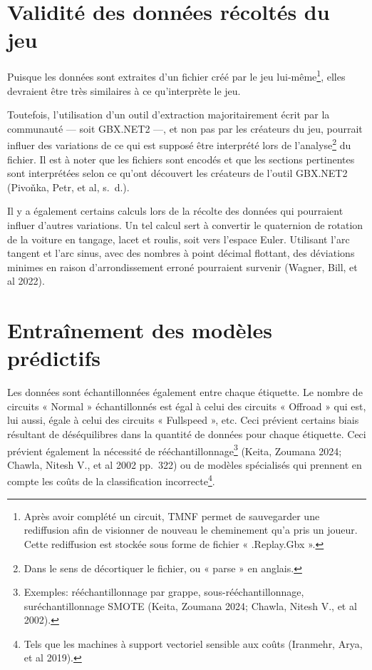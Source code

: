 \documentclass[
  oneside,
  open=any]{scrreprt}
\begin{document}
\section{Validité des données récoltés du
jeu}\label{validituxe9-des-donnuxe9es-ruxe9coltuxe9s-du-jeu}

Puisque les données sont extraites d'un fichier créé par le jeu
lui-même\footnote{Après avoir complété un circuit, TMNF permet de
  sauvegarder une rediffusion afin de visionner de nouveau le
  cheminement qu'a pris un joueur. Cette rediffusion est stockée sous
  forme de fichier « .Replay.Gbx ».}, elles devraient être très
similaires à ce qu'interprète le jeu.

Toutefois, l'utilisation d'un outil d'extraction majoritairement écrit
par la communauté --- soit GBX.NET2 ---, et non pas par les créateurs du
jeu, pourrait influer des variations de ce qui est supposé être
interprété lors de l'analyse\footnote{Dans le sens de décortiquer le
  fichier, ou « parse » en anglais.} du fichier. Il est à noter que les
fichiers sont encodés et que les sections pertinentes sont interprétées
selon ce qu'ont découvert les créateurs de l'outil GBX.NET2 (Pivoňka,
Petr, et al, s.~d.).

Il y a également certains calculs lors de la récolte des données qui
pourraient influer d'autres variations. Un tel calcul sert à convertir
le quaternion de rotation de la voiture en tangage, lacet et roulis,
soit vers l'espace Euler. Utilisant l'arc tangent et l'arc sinus, avec
des nombres à point décimal flottant, des déviations minimes en raison
d'arrondissement erroné pourraient survenir (Wagner, Bill, et al 2022).

\section{Entraînement des modèles
prédictifs}\label{entrauxeenement-des-moduxe8les-pruxe9dictifs}

Les données sont échantillonnées également entre chaque étiquette. Le
nombre de circuits « Normal » échantillonnés est égal à celui des
circuits « Offroad » qui est, lui aussi, égale à celui des circuits «
Fullspeed », etc. Ceci prévient certains biais résultant de
déséquilibres dans la quantité de données pour chaque étiquette. Ceci
prévient également la nécessité de rééchantillonnage\footnote{Exemples:
  rééchantillonnage par grappe, sous-rééchantillonnage,
  suréchantillonnage SMOTE (Keita, Zoumana 2024; Chawla, Nitesh V., et
  al 2002).} (Keita, Zoumana 2024; Chawla, Nitesh V., et al 2002
pp.~322) ou de modèles spécialisés qui prennent en compte les coûts de
la classification incorrecte\footnote{Tels que les machines à support
  vectoriel sensible aux coûts (Iranmehr, Arya, et al 2019).}.
\end{document}
